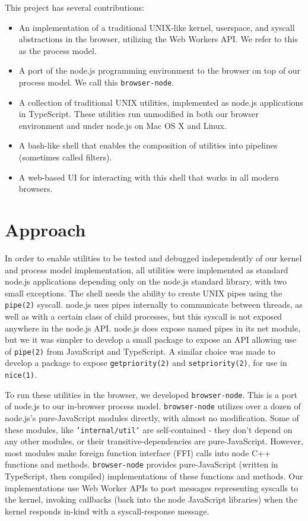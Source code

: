 \documentclass{acm_proc_article-sp}
\begin{document}
This project has several contributions:

\begin{itemize}
  \item An implementation of a traditional UNIX-like kernel,
    userspace, and syscall abstractions in the browser, utilizing the
    Web Workers API.  We refer to this as the process model.
  \item A port of the node.js programming environment to the browser
    on top of our process model.  We call this \texttt{browser-node}.
  \item A collection of traditional UNIX utilities, implemented as
    node.js applications in TypeScript.  These utilities run
    unmodified in both our browser environment and under node.js on
    Mac OS X and Linux.
  \item A bash-like shell that enables the composition of utilities
    into pipelines (sometimes called filters).
  \item A web-based UI for interacting with this shell that works in
    all modern browsers.
\end{itemize}


\section{Approach}

In order to enable utilities to be tested and debugged independently
of our kernel and process model implementation, all utilities were
implemented as standard node.js applications depending only on the
node.js standard library, with two small exceptions.  The shell needs
the ability to create UNIX pipes using the \texttt{pipe(2)} syscall.
node.js uses pipes internally to communicate between threads, as well
as with a certain class of child processes, but this syscall is not
exposed anywhere in the node.js API.  node.js does expose named pipes
in its net module, but we it was simpler to develop a small package to
expose an API allowing use of \texttt{pipe(2)} from JavaScript and
TypeScript.  A similar choice was made to develop a package to expose
\texttt{getpriority(2)} and \texttt{setpriority(2)}, for use in
\texttt{nice(1)}.


To run these utilities in the browser, we developed
\texttt{browser-node}.  This is a port of node.js to our in-browser
process model.  \texttt{browser-node} utilizes over a dozen of
node.js's pure-JavaScript modules directly, with almost no
modification.  Some of these modules, like \texttt{'internal/util'}
are self-contained - they don't depend on any other modules, or their
transitive-dependencies are pure-JavaScript.  However, most modules
make foreign function interface (FFI) calls into node C++ functions
and methods.  \texttt{browser-node} provides pure-JavaScript (written
in TypeScript, then compiled) implementations of these functions and
methods.  Our implementations use Web Worker APIs to post messages
representing syscalls to the kernel, invoking callbacks (back into the
node JavaScript libraries) when the kernel responds in-kind with a
syscall-response message.
\end{document}

